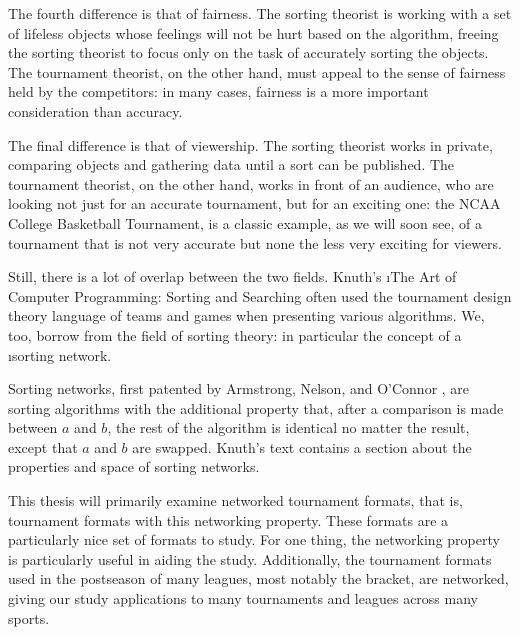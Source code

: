 {    The fourth difference is that of fairness. The sorting theorist is working with a set of lifeless objects whose feelings will not be hurt based on the algorithm, freeing the sorting theorist to focus only on the task of accurately sorting the objects. The tournament theorist, on the other hand, must appeal to the sense of fairness held by the competitors: in many cases, fairness is a more important consideration than accuracy. 
    
    The final difference is that of viewership. The sorting theorist works in private, comparing objects and gathering data until a sort can be published. The tournament theorist, on the other hand, works in front of an audience, who are looking not just for an accurate tournament, but for an exciting one: the NCAA College Basketball Tournament, is a classic example, as we will soon see, of a tournament that is not very accurate but none the less very exciting for viewers.

    Still, there is a lot of overlap between the two fields. Knuth's \i{The Art of Computer Programming: Sorting and Searching} \cite{knuth} often used the tournament design theory language of teams and games when presenting various algorithms. We, too, borrow from the field of sorting theory: in particular the concept of a \i{sorting network}.

    Sorting networks, first patented by Armstrong, Nelson, and O'Connor \cite{pat}, are sorting algorithms with the additional property that, after a comparison is made between $a$ and $b$, the rest of the algorithm is identical no matter the result, except that $a$ and $b$ are swapped. Knuth's text contains a section about the properties and space of sorting networks.

    This thesis will primarily examine networked tournament formats, that is, tournament formats with this networking property. These formats are a particularly nice set of formats to study. For one thing, the networking property is particularly useful in aiding the study. Additionally, the tournament formats used in the postseason of many leagues, most notably the bracket, are networked, giving our study applications to many tournaments and leagues across many sports.
}



